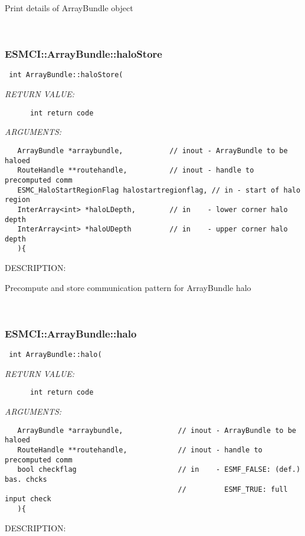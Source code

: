       Print details of ArrayBundle object 
   
 
\mbox{}\hrulefill\
 
\subsubsection [ESMCI::ArrayBundle::haloStore] {ESMCI::ArrayBundle::haloStore}


  
\begin{verbatim} int ArrayBundle::haloStore(\end{verbatim}{\em RETURN VALUE:}
\begin{verbatim}      int return code\end{verbatim}{\em ARGUMENTS:}
\begin{verbatim}   ArrayBundle *arraybundle,           // inout - ArrayBundle to be haloed
   RouteHandle **routehandle,          // inout - handle to precomputed comm
   ESMC_HaloStartRegionFlag halostartregionflag, // in - start of halo region
   InterArray<int> *haloLDepth,        // in    - lower corner halo depth
   InterArray<int> *haloUDepth         // in    - upper corner halo depth
   ){    \end{verbatim}
{\sf DESCRIPTION:\\ }


    Precompute and store communication pattern for ArrayBundle halo 
   
 
\mbox{}\hrulefill\
 
\subsubsection [ESMCI::ArrayBundle::halo] {ESMCI::ArrayBundle::halo}


  
\begin{verbatim} int ArrayBundle::halo(\end{verbatim}{\em RETURN VALUE:}
\begin{verbatim}      int return code\end{verbatim}{\em ARGUMENTS:}
\begin{verbatim}   ArrayBundle *arraybundle,             // inout - ArrayBundle to be haloed
   RouteHandle **routehandle,            // inout - handle to precomputed comm
   bool checkflag                        // in    - ESMF_FALSE: (def.) bas. chcks
                                         //         ESMF_TRUE: full input check
   ){    \end{verbatim}
{\sf DESCRIPTION:\\ }


